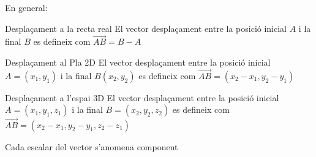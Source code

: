 \documentclass{beamer}
\begin{document}
\begin{frame}

En general:

\begin{exampleblock}{Desplaçament a la recta real}
El vector desplaçament entre la posició inicial $A$ i la final $B$ es defineix com $\vec{AB}= B-A$
\end{exampleblock}

\begin{exampleblock}{Desplaçament al Pla 2D}
El vector desplaçament entre la posició inicial $A=(x_1,y_1)$ i la final $B(x_2,y_2)$ es defineix com $\vec{AB}=(x_2-x_1,y_2-y_1)$
\end{exampleblock}

\begin{exampleblock}{Desplaçament a l'espai 3D}
El vector desplaçament entre la posició inicial $A=(x_1,y_1,z_1)$ i la final $B=(x_2,y_2,z_2)$ es defineix com $\vec{AB}=(x_2-x_1,y_2-y_1,z_2-z_1)$
\end{exampleblock}
Cada escalar del vector s'anomena component
\end{frame}
\end{document}
